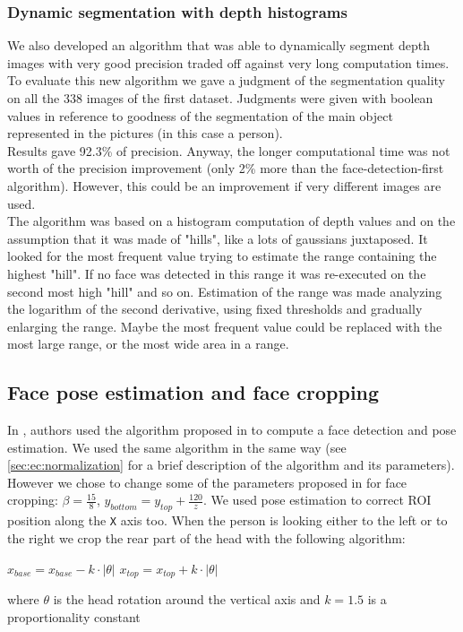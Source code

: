 \documentclass{article}
\begin{document}
\subsubsection{Dynamic segmentation with depth histograms}
We also developed an algorithm that was able to dynamically segment depth images with very good precision traded off against very long computation times. \\
To evaluate this new algorithm we gave a judgment of the segmentation quality on all the 338 images of the first dataset. Judgments were given with boolean values in reference to goodness of the segmentation of the main object represented in the pictures (in this case a person).	\\
Results gave 92.3\% of precision. Anyway, the longer computational time was not worth of the precision improvement (only 2\% more than the face-detection-first algorithm). However, this could be an improvement if very different images are used. \\
The algorithm was based on a histogram computation of depth values and on the assumption that it was made of "hills", like a lots of gaussians juxtaposed. It looked for the most frequent value trying to estimate the range containing the highest "hill". If no face was detected in this range it was re-executed on the second most high "hill" and so on. Estimation of the range was made analyzing the logarithm of the second derivative, using fixed thresholds and gradually enlarging the range. Maybe the most frequent value could be replaced with the most large range, or the most wide area in a range.

	\subsection{Face pose estimation and face cropping}	\label{sec:cropping}
	In \citep{Hayat2016}, authors used the algorithm proposed in \citep{Fanelli2011} to compute a face detection and pose estimation. We used the same algorithm in the same way (see \ref{sec:ec:normalization} for a brief description of the algorithm and its parameters). However we chose to change some of the parameters proposed in \citep{Hayat2016} for face cropping: $\beta = \frac{15}{8}$, $y_{bottom} = y_{top} + \frac{120}{z}$. We used pose estimation to correct ROI position along the \verb|X| axis too. When the person is looking either to the left or to the right we crop the rear part of the head with the following algorithm:
	\begin{algorithm}
	\begin{algorithmic}[1]
			\State $x_{base} = x_{base} - k \cdot |\theta|$
		\Else
			\State $x_{top} = x_{top} + k \cdot |\theta|$
		\EndIf
	\end{algorithmic}
	\end{algorithm}
	where $\theta$ is the head rotation around the vertical axis and $k = 1.5$ is a proportionality constant 
	
\end{document}
